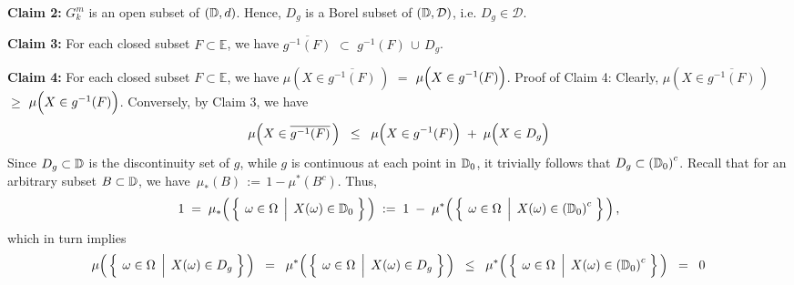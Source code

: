 \vskip 0.5cm
\noindent
\textbf{Claim 2:}\;\;
$G^{m}_{k}$ is an open subset of $(\mathbb{D},d)$. Hence, $D_{g}$ is a Borel subset of $(\mathbb{D},\mathcal{D})$, i.e. $D_{g} \in \mathcal{D}$.

\vskip 0.5cm
\noindent
\textbf{Claim 3:}\;\;
For each closed subset $F \subset \mathbb{E}$, we have\;
$\overline{g^{-1}(F)}$ \;$\subset$\; $g^{-1}(F)\,\cup\,D_{g}$.

\vskip 0.5cm
\noindent
\textbf{Claim 4:}\;\;
For each closed subset $F \subset \mathbb{E}$, we have\;
$\mu\!\left(X\in\overline{g^{-1}(F)}\,\right)$ \;$=$\;
$\mu\!\left(X\overset{{\color{white}.}}{\in} g^{-1}(F)\right)$.
\vskip 0.1cm
\noindent
Proof of Claim 4:\quad
Clearly, 
$\mu\!\left(X\in\overline{g^{-1}(F)}\,\right)$ \;$\geq$\;
$\mu\!\left(X\overset{{\color{white}.}}{\in} g^{-1}(F)\right)$.
Conversely, by Claim 3, we have
\begin{equation*}
\mu\!\left(X\in\overline{g^{-1}(F)}\,\right)
\;\;\leq\;\;
	\mu\!\left(X\overset{{\color{white}.}}{\in} g^{-1}(F)\right)
	\; + \;
	\mu\!\left(X\overset{{\color{white}.}}{\in} D_{g}\right)
\end{equation*}
Since $D_{g} \subset \mathbb{D}$ is the discontinuity set of $g$, while $g$ is continuous at each point in $\mathbb{D}_{0}$,
it trivially follows that $D_{g} \subset \left(\mathbb{D}_{0}\right)^{c}$.
Recall that for an arbitrary subset $B \subset \mathbb{D}$, we have \,$\mu_{*}(B) \,:=\, 1 - \mu^{*}(B^{c})$.
Thus,
\begin{equation*}
1
\;=\;
	\mu_{*}\!\left(\,\left\{\;\left.\omega\overset{{\color{white}.}}{\in}\Omega\;\,\right\vert\;X(\omega)\in\D_{0}\;\right\}\,\right)
\;:=\;
	1 \; - \; \mu^{*}\!\left(\,\left\{\;\left.\omega\overset{{\color{white}.}}{\in}\Omega\;\,\right\vert\;X(\omega)\in\left(\D_{0}\right)^{c}\;\right\}\,\right),
\end{equation*}
which in turn implies
\begin{equation*}
\mu\!\left(\,\left\{\;\left.\omega\overset{{\color{white}.}}{\in}\Omega\;\,\right\vert\;X(\omega)\in D_{g}\;\right\}\,\right)
\;\;=\;\; \mu^{*}\!\left(\,\left\{\;\left.\omega\overset{{\color{white}.}}{\in}\Omega\;\,\right\vert\;X(\omega)\in D_{g}\;\right\}\,\right)
\;\;\leq\;\; \mu^{*}\!\left(\,\left\{\;\left.\omega\overset{{\color{white}.}}{\in}\Omega\;\,\right\vert\;X(\omega)\in\left(\D_{0}\right)^{c}\;\right\}\,\right)
\;\;=\;\; 0
\end{equation*}

